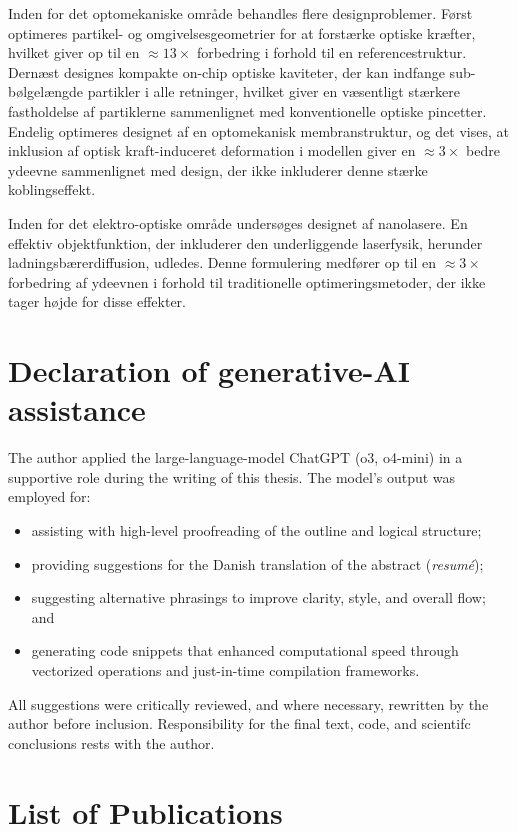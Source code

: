 Inden for det optomekaniske område behandles flere designproblemer. Først optimeres partikel- og omgivelsesgeometrier for at forstærke optiske kræfter, hvilket giver op til en $\approx 13 \times$ forbedring i forhold til en referencestruktur. Dernæst designes kompakte on-chip optiske kaviteter, der kan indfange sub-bølgelængde partikler i alle retninger, hvilket giver en væsentligt stærkere fastholdelse af partiklerne sammenlignet med konventionelle optiske pincetter. Endelig optimeres designet af en optomekanisk membran\-struktur, og det vises, at inklusion af optisk kraft-induceret deformation i modellen giver en $\approx 3 \times$ bedre ydeevne sammenlignet med design, der ikke inkluderer denne stærke koblingseffekt.

Inden for det elektro-optiske område undersøges designet af nanolasere. En effektiv objektfunktion, der inkluderer den underliggende laser\-fy\-sik, herunder ladningsbærerdiffusion, udledes. Denne formulering medfører op til en \mbox{$\approx 3 \times$} forbe\-dring af ydeevnen i forhold til traditionelle optimeringsmetoder, der ikke tager højde for disse effekter.

\cleardoublepage
\chapter*{Declaration of generative-AI assistance}

The author applied the large-language-model ChatGPT (o3, o4-mini) in a supportive role
during the writing of this thesis. The model's output was employed for:
\begin{itemize}
\item assisting with high-level proofreading of the outline and logical structure;
\item providing suggestions for the Danish translation of the abstract (\emph{resumé});
\item suggesting alternative phrasings to improve clarity, style, and overall flow; and
\item generating code snippets that enhanced computational speed through vectorized operations and just-in-time compilation frameworks.
\end{itemize}
All suggestions were critically reviewed, and where necessary, rewritten by the author before
inclusion. Responsibility for the final text, code, and scientifc conclusions rests with the author.

\cleardoublepage
\chapter*{List of Publications}
\nocite{ownpub0,ownpub1,ownpub3, ownpub2, ownpub4, ownpub5}
\newrefcontext[sorting=none,labelprefix=P]
\printbibliography[env=bibliographyNUM,keyword=myPub,title={List of publications},heading=none,resetnumbers]
\newrefcontext[sorting=none,labelprefix=M]
\printbibliography[env=bibliographyNUM,keyword=myMan,heading=none]

\cleardoublepage

{
  \hypersetup{linkcolor=black}
  \tableofcontents*
}



